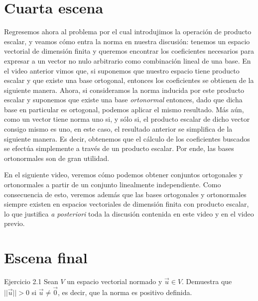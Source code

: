 \documentclass[12pt,dvipsnames]{article}
\numberwithin{equation}{section}
\begin{document}

\newpage
\section{Cuarta escena}

Regresemos ahora al problema por el cual introdujimos la operación de producto escalar, y veamos cómo entra la norma en nuestra discusión: tenemos un espacio vectorial de dimensión finita y queremos encontrar los coeficientes necesarios para expresar a un vector no nulo arbitrario como combinación lineal de una base. En el video anterior vimos que, si suponemos que nuestro espacio tiene producto escalar y que existe una base ortogonal, entonces los coeficientes se obtienen de la siguiente manera. Ahora, si consideramos la norma inducida por este producto escalar y suponemos que existe una base \emph{ortonormal} entonces, dado que dicha base en particular es ortogonal, podemos aplicar el mismo resultado. Más aún, como un vector tiene norma uno si, y sólo si, el producto escalar de dicho vector consigo mismo es uno, en este caso, el resultado anterior se simplifica de la siguiente manera. Es decir, obtenemos que el cálculo de los coeficientes buscados se efectúa simplemente a través de un producto escalar. Por ende, las bases ortonormales son de gran utilidad.

En el siguiente video, veremos cómo podemos obtener conjuntos ortogonales y ortonormales a partir de un conjunto linealmente independiente. Como consecuencia de esto, veremos además que las bases ortogonales y ortonormales siempre existen en espacios vectoriales de dimensión finita con producto escalar, lo que justifica \emph{a posteriori} toda la discusión contenida en este video y en el video previo.


\newpage
\section{Escena final}


Ejercicio 2.1 Sean $V$ un espacio vectorial normado y $\vec{u}\in V$. Demuestra que $||\vec{u}||>0$ si $\vec{u}\neq \vec{0}$, es decir, que la norma es positivo definida. \\
\end{document}
